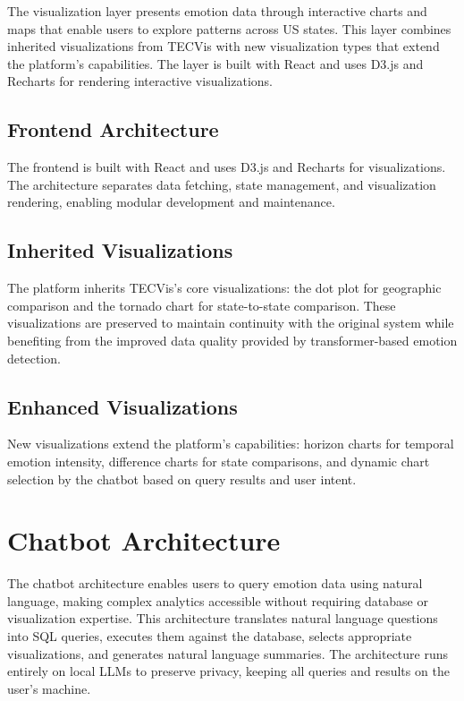 The visualization layer presents emotion data through interactive charts and maps that enable users to explore patterns across US states. This layer combines inherited visualizations from TECVis with new visualization types that extend the platform's capabilities. The layer is built with React and uses D3.js and Recharts for rendering interactive visualizations.

\subsection{Frontend Architecture}

The frontend is built with React and uses D3.js and Recharts for visualizations. The architecture separates data fetching, state management, and visualization rendering, enabling modular development and maintenance.

\subsection{Inherited Visualizations}

The platform inherits TECVis's core visualizations: the dot plot for geographic comparison and the tornado chart for state-to-state comparison. These visualizations are preserved to maintain continuity with the original system while benefiting from the improved data quality provided by transformer-based emotion detection.

\subsection{Enhanced Visualizations}

New visualizations extend the platform's capabilities: horizon charts for temporal emotion intensity, difference charts for state comparisons, and dynamic chart selection by the chatbot based on query results and user intent.


\section{Chatbot Architecture}

The chatbot architecture enables users to query emotion data using natural language, making complex analytics accessible without requiring database or visualization expertise. This architecture translates natural language questions into SQL queries, executes them against the database, selects appropriate visualizations, and generates natural language summaries. The architecture runs entirely on local LLMs to preserve privacy, keeping all queries and results on the user's machine.

